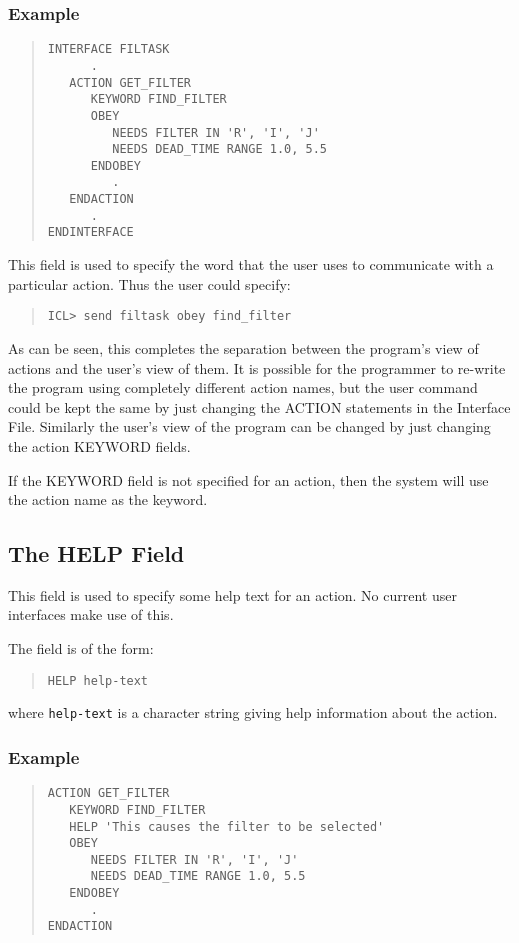 \documentclass[twoside,11pt]{article}
\newcommand{\xlabel}[1]{}
\renewcommand{\_}{\texttt{\symbol{95}}}
\begin{document}
\subsubsection*{Example}
\begin{quote} \begin{verbatim}
INTERFACE FILTASK
      .
   ACTION GET_FILTER
      KEYWORD FIND_FILTER
      OBEY
         NEEDS FILTER IN 'R', 'I', 'J'
         NEEDS DEAD_TIME RANGE 1.0, 5.5
      ENDOBEY
         .
   ENDACTION
      .
ENDINTERFACE
\end{verbatim} \end{quote}
This field is used to specify the word that the user uses to communicate
with a particular action. Thus the user could specify:
\begin{quote} \begin{verbatim}
ICL> send filtask obey find_filter
\end{verbatim} \end{quote}
As can be seen, this completes the separation between the program's
view of actions and the user's view of them. It is possible for the
programmer to re-write the program using completely different action
names, but the user command could be kept the same by just changing the
ACTION statements in the Interface File. Similarly the
user's view of the program can be changed by just changing the
action KEYWORD fields.

If the KEYWORD field is not specified for an action, then the system will
use the action name as the keyword.

\subsection{The HELP Field\xlabel{the_help_field}}

This field is used to specify some help text for an action. No current
user interfaces make use of this.

The field is of the form:
\begin{quote} \begin{verbatim}
HELP help-text
\end{verbatim} \end{quote}
where \texttt{help-text} is a character string giving help information about the
action.
\subsubsection*{Example}
\begin{quote} \begin{verbatim}
ACTION GET_FILTER
   KEYWORD FIND_FILTER
   HELP 'This causes the filter to be selected'
   OBEY
      NEEDS FILTER IN 'R', 'I', 'J'
      NEEDS DEAD_TIME RANGE 1.0, 5.5
   ENDOBEY
      .
ENDACTION
\end{verbatim} \end{quote}
\end{document}
